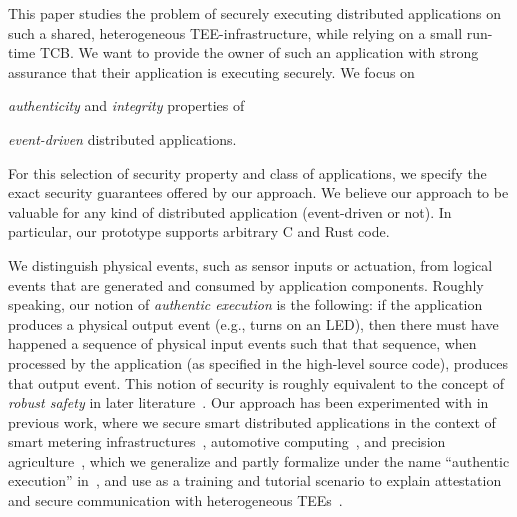This paper studies the problem of securely executing distributed applications on
such a shared, heterogeneous \ac{TEE}-infrastructure, while relying on  a small
run-time \ac{TCB}.  We want to provide the owner of such an application with
strong assurance that their application is executing securely.  We focus on
%
\begin{paraenum}
%
  \item \emph{authenticity} and \emph{integrity} properties of
%
  \item \emph{event-driven} distributed applications.
%
\end{paraenum}
%
For this selection of security property and class of applications, we specify
the exact security guarantees offered by our approach. We believe our approach
to be valuable for any kind of distributed application (event-driven or not). In
particular, our prototype supports arbitrary C and Rust code.

We distinguish physical events, such as sensor inputs or actuation, from logical
events that are generated and consumed by application components.
%
Roughly speaking, our notion of \emph{authentic execution} is the
following: if the application produces a physical output event (e.g., turns
on an LED), then there must have happened a sequence of physical input
events such that that sequence, when processed by the application (as
specified in the high-level source code), produces that output event.
%
This
notion of security is roughly equivalent to the concept of \emph{robust
safety} in later literature~\cite{abate2019journey}.
%
Our approach has been experimented with in previous work,
where we secure smart distributed applications in the context of smart
metering infrastructures~\cite{muehlber_smart_meter}, automotive
computing~\cite{vanbulck_2017vulcan}, and precision
agriculture~\cite{scopelliti2020thesis}, which we generalize and partly
formalize under the name \enquote{authentic execution}
in~\cite{noorman:authentic-execution}, and use as a training and tutorial
scenario to explain attestation and secure communication with heterogeneous
\acp{TEE}~\cite{muehlber_2018tutorial_enclaves}. 

\clearpage

